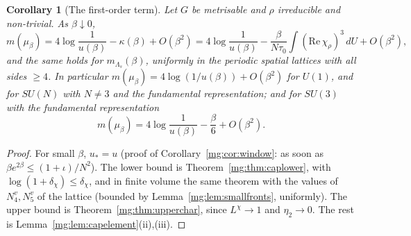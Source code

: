 \documentclass[11pt,a4paper]{article}
\newtheorem{corollary}[theorem]{Corollary}
\theoremstyle{definition}
\theoremstyle{remark}
\newcommand{\dU}{\,dU}
\begin{document}
\begin{corollary}[The first-order term]\label{mg:cor:firstorder2}
Let $G$ be metrisable and $\rho$ irreducible and non-trivial. As $\beta\downarrow0$,
\[
m(\mu_\beta)=4\log\frac1{u(\beta)}-\kappa(\beta)+O(\beta^2)=4\log\frac1{u(\beta)}-\frac\beta{N\tau_0}\int(\mathrm{Re}\,\chi_\rho)^3\dU+O(\beta^2),
\]
and the same holds for $m_{\Lambda_s}(\beta)$, uniformly in the periodic spatial lattices with all sides $\ge4$. In particular
$m(\mu_\beta)=4\log(1/u(\beta))+O(\beta^2)$ for $U(1)$, and for $SU(N)$ with $N\ne3$ and the fundamental representation; and for $SU(3)$ with the
fundamental representation
\[
m(\mu_\beta)=4\log\frac1{u(\beta)}-\frac\beta6+O(\beta^2).
\]
\end{corollary}

\begin{proof}
For small $\beta$, $u_*=u$ (proof of Corollary~\ref{mg:cor:window}: as soon as $\beta e^{2\beta}\le(1+\iota)/N^2$). The lower bound is
Theorem~\ref{mg:thm:caplower}, with $\log(1+\delta_\chi)\le\delta_\chi$, and in finite volume the same theorem with the values of $N^v_4,N^v_5$ of the
lattice (bounded by Lemma~\ref{mg:lem:smallfronts}, uniformly). The upper bound is Theorem~\ref{mg:thm:upperchar}, since $L^\chi\to1$ and $\eta_2\to0$.
The rest is Lemma~\ref{mg:lem:capelement}(ii),(iii).
\end{proof}
\end{document}
